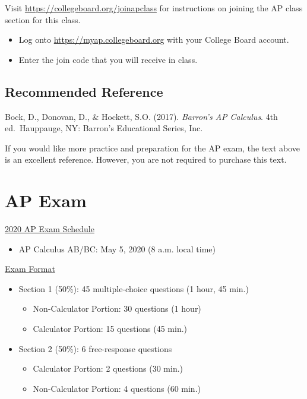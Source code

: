 \documentclass[12pt,fleqn]{article}
\providecommand{\tightlist}{%
  \setlength{\itemsep}{0pt}\setlength{\parskip}{0pt}}
\begin{document}
Visit \url{https://collegeboard.org/joinapclass} for instructions on joining the AP class section for this class.

\begin{itemize}
\item
  Log onto \url{https://myap.collegeboard.org} with your College Board account.
\item
  Enter the join code that you will receive in class.
\end{itemize}

\hypertarget{recommended-reference}{%
\subsection{Recommended Reference}\label{recommended-reference}}

Bock, D., Donovan, D., \& Hockett, S.O. (2017). \emph{Barron's AP
Calculus}. 4th ed.~Hauppauge, NY: Barron's Educational Series,
Inc.

If you would like more practice and preparation for the AP exam, the text above is an excellent reference. However, you are not required to purchase this text.

\hypertarget{ap-exam}{%
\section{AP Exam}\label{ap-exam}}

\href{https://apcentral.collegeboard.org/courses/exam-dates-and-fees/exam-dates-2020}{2020 AP Exam Schedule}

\begin{itemize}
\tightlist
\item
  AP Calculus AB/BC: May 5, 2020 (8 a.m. local time)
\end{itemize}

\href{https://apcentral.collegeboard.org/courses/ap-calculus-ab/exam}{Exam Format}

\begin{itemize}
\tightlist
\item
  Section 1 (50\%): 45 multiple-choice questions (1 hour, 45 min.)

  \begin{itemize}
  \tightlist
  \item
    Non-Calculator Portion: 30 questions (1 hour)
  \item
    Calculator Portion: 15 questions (45 min.)
  \end{itemize}
\item
  Section 2 (50\%): 6 free-response questions

  \begin{itemize}
  \tightlist
  \item
    Calculator Portion: 2 questions (30 min.)
  \item
    Non-Calculator Portion: 4 questions (60 min.)
  \end{itemize}
\end{itemize}
\end{document}
